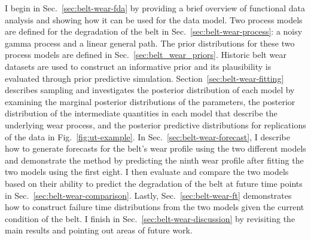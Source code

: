 I begin in Sec.~\ref{sec:belt-wear-fda} by providing a brief overview of functional data analysis and showing how it can be used for the data model. Two process models are defined for the degradation of the belt in Sec.~\ref{sec:belt-wear-process}: a noisy gamma process and a linear general path. The prior distributions for these two process models are defined in Sec.~\ref{sec:belt_wear_priors}. Historic belt wear datasets are used to construct an informative prior and its plausibility is evaluated through prior predictive simulation. Section~\ref{sec:belt-wear-fitting} describes sampling and investigates the posterior distribution of each model by examining the marginal posterior distributions of the parameters, the posterior distribution of the intermediate quantities in each model that describe the underlying wear process, and the posterior predictive distributions for replications of the data in Fig.~\ref{fig:ut-example}. In Sec.~\ref{sec:belt-wear-forecast}, I describe how to generate forecasts for the belt's wear profile using the two different models and demonstrate the method by predicting the ninth wear profile after fitting the two models using the first eight. I then evaluate and compare the two models based on their ability to predict the degradation of the belt at future time points in Sec.~\ref{sec:belt-wear-comparison}. Lastly, Sec.~\ref{sec:belt-wear-ft} demonstrates how to construct failure time distributions from the two models given the current condition of the belt. I finish in Sec.~\ref{sec:belt-wear-discussion} by revisiting the main results and pointing out areas of future work.

